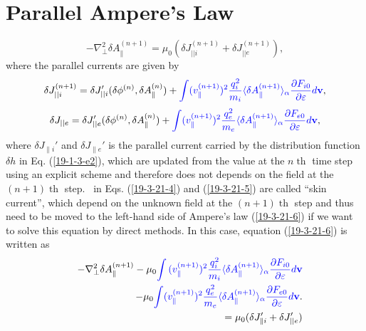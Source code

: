 \documentclass{llncs}
\newcommand{\tmcolor}[2]{{\color{#1}{#2}}}
\newcommand{\tmop}[1]{\ensuremath{\operatorname{#1}}}
\begin{document}
\section{Parallel Ampere's Law}\label{24-12-10-e2}
\begin{equation}
  \label{19-3-21-6} - \nabla^2_{\perp} \delta A_{\parallel}^{(n + 1)} = \mu_0 
  (\delta J_{||i}^{(n + 1)} + \delta J_{||e}^{(n + 1)}),
\end{equation}
where the parallel currents are given by
\begin{equation}
  \label{19-3-21-4} \delta J_{|| i}^{(n + 1)} = \delta J_{|| i}' (\delta
  \phi^{(n)}, \delta A_{\parallel}^{(n)}) + \tmcolor{blue}{\int
  (v_{\parallel}^{(n + 1)})^2 \frac{q^2_i}{m_i} \langle \delta
  A_{\parallel}^{(n + 1)} \rangle_{\alpha} \frac{\partial F_{i 0}}{\partial
  \varepsilon} d\mathbf{v}},
\end{equation}
\begin{equation}
  \label{19-3-21-5} \delta J_{|| e} = \delta J_{|| e}' (\delta \phi^{(n)},
  \delta A_{\parallel}^{(n)}) + \tmcolor{blue}{\int (v_{\parallel}^{(n +
  1)})^2 \frac{q^2_e}{m_e} \langle \delta A_{\parallel}^{(n + 1)}
  \rangle_{\alpha} \frac{\partial F_{e 0}}{\partial \varepsilon} d\mathbf{v}},
\end{equation}
where $\delta J_{\parallel i}'$ and $\delta J_{\parallel e}'$ is the parallel
current carried by the distribution function $\delta h$ in Eq.
(\ref{19-1-3-e2}), which are updated from the value at the $n \tmop{th}$ time
step using an explicit scheme and therefore does not depends on the field at
the $(n + 1) \tmop{th}$ step. \tmcolor{blue}{The blue terms} \ in Eqs.
(\ref{19-3-21-4}) and (\ref{19-3-21-5}) are called ``skin current'', which
depend on the unknown field at the $(n + 1) \tmop{th}$ step and thus need to
be moved to the left-hand side of Ampere's law (\ref{19-3-21-6}) if we want to
solve this equation by direct methods. In this case, equation
(\ref{19-3-21-6}) is written as
\begin{eqnarray}
  &  & - \nabla^2_{\perp} \delta A_{\parallel}^{(n + 1)} - \mu_0
  \tmcolor{blue}{\int {(v_{\parallel}^{(n + 1)})^2}  \frac{q^2_i}{m_i} \langle
  \delta A_{\parallel}^{(n + 1)} \rangle_{\alpha} \frac{\partial F_{i
  0}}{\partial \varepsilon} d\mathbf{v}} \nonumber\\
  &  & - \mu_0 \tmcolor{blue}{\int (v_{\parallel}^{(n + 1)})^2
  \frac{q^2_e}{m_e} \langle \delta A_{\parallel}^{(n + 1)} \rangle_{\alpha}
  \frac{\partial F_{e 0}}{\partial \varepsilon} d\mathbf{v}} . \nonumber\\
  &  & = \mu_0  (\delta J_{\parallel i}' + \delta J'_{||e}) 
\end{eqnarray}
\end{document}
